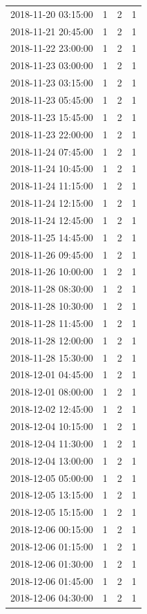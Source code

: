 \begin{tabular}{lrrr}
2018-11-20 03:15:00 & 1 & 2 & 1 \\
2018-11-21 20:45:00 & 1 & 2 & 1 \\
2018-11-22 23:00:00 & 1 & 2 & 1 \\
2018-11-23 03:00:00 & 1 & 2 & 1 \\
2018-11-23 03:15:00 & 1 & 2 & 1 \\
2018-11-23 05:45:00 & 1 & 2 & 1 \\
2018-11-23 15:45:00 & 1 & 2 & 1 \\
2018-11-23 22:00:00 & 1 & 2 & 1 \\
2018-11-24 07:45:00 & 1 & 2 & 1 \\
2018-11-24 10:45:00 & 1 & 2 & 1 \\
2018-11-24 11:15:00 & 1 & 2 & 1 \\
2018-11-24 12:15:00 & 1 & 2 & 1 \\
2018-11-24 12:45:00 & 1 & 2 & 1 \\
2018-11-25 14:45:00 & 1 & 2 & 1 \\
2018-11-26 09:45:00 & 1 & 2 & 1 \\
2018-11-26 10:00:00 & 1 & 2 & 1 \\
2018-11-28 08:30:00 & 1 & 2 & 1 \\
2018-11-28 10:30:00 & 1 & 2 & 1 \\
2018-11-28 11:45:00 & 1 & 2 & 1 \\
2018-11-28 12:00:00 & 1 & 2 & 1 \\
2018-11-28 15:30:00 & 1 & 2 & 1 \\
2018-12-01 04:45:00 & 1 & 2 & 1 \\
2018-12-01 08:00:00 & 1 & 2 & 1 \\
2018-12-02 12:45:00 & 1 & 2 & 1 \\
2018-12-04 10:15:00 & 1 & 2 & 1 \\
2018-12-04 11:30:00 & 1 & 2 & 1 \\
2018-12-04 13:00:00 & 1 & 2 & 1 \\
2018-12-05 05:00:00 & 1 & 2 & 1 \\
2018-12-05 13:15:00 & 1 & 2 & 1 \\
2018-12-05 15:15:00 & 1 & 2 & 1 \\
2018-12-06 00:15:00 & 1 & 2 & 1 \\
2018-12-06 01:15:00 & 1 & 2 & 1 \\
2018-12-06 01:30:00 & 1 & 2 & 1 \\
2018-12-06 01:45:00 & 1 & 2 & 1 \\
2018-12-06 04:30:00 & 1 & 2 & 1 \\

\end{tabular}
